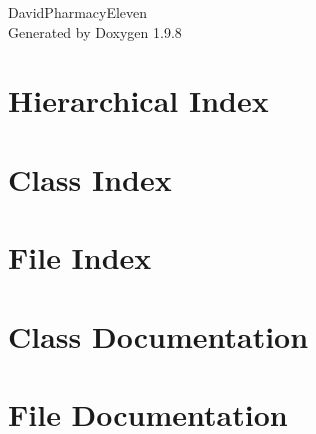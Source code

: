 \documentclass[twoside]{book}
\newcommand{\+}{\discretionary{\mbox{\scriptsize$\hookleftarrow$}}{}{}}
\newcommand{\clearemptydoublepage}{%
    \newpage{\pagestyle{empty}\cleardoublepage}%
  }
\begin{document}
  \raggedbottom
    \hypersetup{pageanchor=false,
                bookmarksnumbered=true,
                pdfencoding=unicode
               }
  \begin{titlepage}
  \vspace*{7cm}
  \begin{center}%
  {\Large David\+Pharmacy\+Eleven}\\
  \vspace*{1cm}
  {\large Generated by Doxygen 1.9.8}\\
  \end{center}
  \end{titlepage}
  \clearemptydoublepage
  \tableofcontents
  \clearemptydoublepage
  \hypersetup{pageanchor=true}

\chapter{Hierarchical Index}

\chapter{Class Index}

\chapter{File Index}

\chapter{Class Documentation}















\chapter{File Documentation}
















  \backmatter
  \newpage
  \clearemptydoublepage
  \printindex
\end{document}
